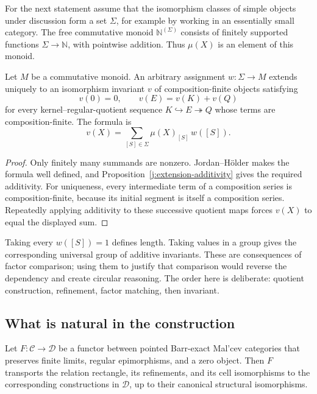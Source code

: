 For the next statement assume that the isomorphism classes of simple
objects under discussion form a set $\Sigma$, for example by working in
an essentially small category.  The free commutative monoid
$\mathbb N^{(\Sigma)}$ consists of finitely supported functions
$\Sigma\to\mathbb N$, with pointwise addition.  Thus $\mu(X)$ is an
element of this monoid.

\begin{corollary}
\label{j:universal-invariant}
\label{j:universal-monoid}
Let $M$ be a commutative monoid.  An arbitrary assignment $w:\Sigma\to M$
extends uniquely to an isomorphism invariant $v$ of composition-finite
objects satisfying
\[
 v(0)=0,\qquad v(E)=v(K)+v(Q)
\]
for every kernel--regular-quotient sequence $K\hookrightarrow
E\twoheadrightarrow Q$ whose terms are composition-finite.  The formula is
\[
                 v(X)=\sum_{[S]\in\Sigma}\mu(X)_{[S]}\,w([S]).
\]
\end{corollary}

\begin{proof}
Only finitely many summands are nonzero.  Jordan--H\"older makes the
formula well defined, and Proposition~\ref{j:extension-additivity} gives
the required additivity.  For uniqueness, every intermediate term of a
composition series is composition-finite, because its initial segment
is itself a composition series.  Repeatedly applying additivity to these
successive quotient maps forces $v(X)$ to equal the displayed sum.
\end{proof}

Taking every $w([S])=1$ defines length.  Taking values in a group gives
the corresponding universal group of additive invariants.  These are
consequences of factor comparison; using them to justify that comparison
would reverse the dependency and create circular reasoning.  The order
here is deliberate: quotient construction, refinement, factor matching,
then invariant.

\subsection{What is natural in the construction}

\begin{proposition}
\label{r:functoriality}
Let $F:\mathcal C\to\mathcal D$ be a functor between pointed Barr-exact
Mal'cev categories that preserves finite limits, regular epimorphisms,
and a zero object.  Then $F$ transports the relation rectangle, its
refinements, and its cell isomorphisms to the corresponding constructions
in $\mathcal D$, up to their canonical structural isomorphisms.
\end{proposition}

